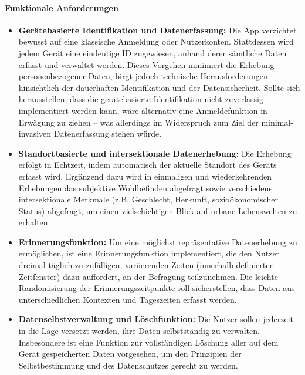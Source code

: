 \paragraph{Funktionale Anforderungen}
\begin{itemize}
    \item \textbf{Gerätebasierte Identifikation und Datenerfassung:}  
    Die App verzichtet bewusst auf eine klassische Anmeldung oder Nutzerkonten. Stattdessen wird jedem Gerät eine eindeutige ID zugewiesen, anhand derer sämtliche Daten erfasst und verwaltet werden. Dieses Vorgehen minimiert die Erhebung personenbezogener Daten, birgt jedoch technische Herausforderungen hinsichtlich der dauerhaften Identifikation und der Datensicherheit. Sollte sich herausstellen, dass die gerätebasierte Identifikation nicht zuverlässig implementiert werden kann, wäre alternativ eine Anmeldefunktion in Erwägung zu ziehen – was allerdings im Widerspruch zum Ziel der minimal-invasiven Datenerfassung stehen würde.

    \item \textbf{Standortbasierte und intersektionale Datenerhebung:}  
    Die Erhebung erfolgt in Echtzeit, indem automatisch der aktuelle Standort des Geräts erfasst wird. Ergänzend dazu wird in einmaligen und wiederkehrenden Erhebungen das subjektive Wohlbefinden abgefragt sowie verschiedene intersektionale Merkmale (z.B. Geschlecht, Herkunft, sozioökonomischer Status) abgefragt, um einen vielschichtigen Blick auf urbane Lebenswelten zu erhalten.

    \item \textbf{Erinnerungsfunktion:}  
    Um eine möglichst repräsentative Datenerhebung zu ermöglichen, ist eine Erinnerungsfunktion implementiert, die den Nutzer dreimal täglich zu zufälligen, variierenden Zeiten (innerhalb definierter Zeitfenster) dazu auffordert, an der Befragung teilzunehmen. Die leichte Randomisierung der Erinnerungszeitpunkte soll sicherstellen, dass Daten aus unterschiedlichen Kontexten und Tageszeiten erfasst werden.

    \item \textbf{Datenselbstverwaltung und Löschfunktion:}  
    Die Nutzer sollen jederzeit in die Lage versetzt werden, ihre Daten selbstständig zu verwalten. Insbesondere ist eine Funktion zur vollständigen Löschung aller auf dem Gerät gespeicherten Daten vorgesehen, um den Prinzipien der Selbstbestimmung und des Datenschutzes gerecht zu werden.
\end{itemize}

